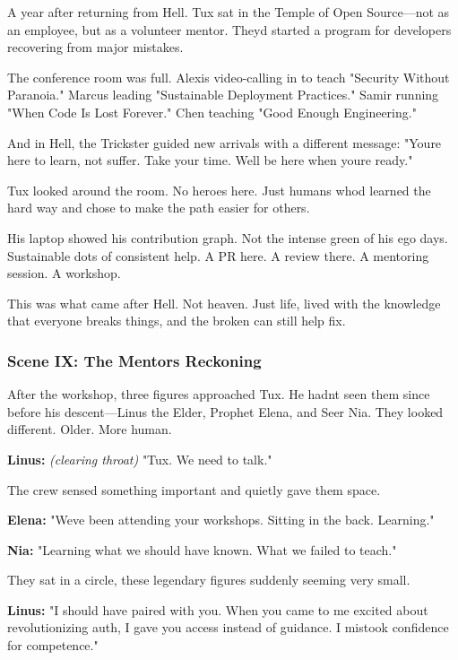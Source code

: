 A year after returning from Hell. Tux sat in the Temple of Open Source---not as an employee, but as a volunteer mentor. They\textquotesingle d started a program for developers recovering from major mistakes.

The conference room was full. Alexis video-calling in to teach "Security Without Paranoia." Marcus leading "Sustainable Deployment Practices." Samir running "When Code Is Lost Forever." Chen teaching "Good Enough Engineering."

And in Hell, the Trickster guided new arrivals with a different message: "You\textquotesingle re here to learn, not suffer. Take your time. We\textquotesingle ll be here when you\textquotesingle re ready."

Tux looked around the room. No heroes here. Just humans who\textquotesingle d learned the hard way and chose to make the path easier for others.

His laptop showed his contribution graph. Not the intense green of his ego days. Sustainable dots of consistent help. A PR here. A review there. A mentoring session. A workshop.

This was what came after Hell. Not heaven. Just life, lived with the knowledge that everyone breaks things, and the broken can still help fix.

\bookdivider

\subsubsection{Scene IX: The Mentors\textquotesingle{} Reckoning}\label{scene-ix-the-mentors-reckoning}

After the workshop, three figures approached Tux. He hadn\textquotesingle t seen them since before his descent---Linus the Elder, Prophet Elena, and Seer Nia. They looked different. Older. More human.

\textbf{Linus:} \emph{(clearing throat)} "Tux. We need to talk."

The crew sensed something important and quietly gave them space.

\textbf{Elena:} "We\textquotesingle ve been attending your workshops. Sitting in the back. Learning."

\textbf{Nia:} "Learning what we should have known. What we failed to teach."

They sat in a circle, these legendary figures suddenly seeming very small.

\textbf{Linus:} "I should have paired with you. When you came to me excited about revolutionizing auth, I gave you access instead of guidance. I mistook confidence for competence."

